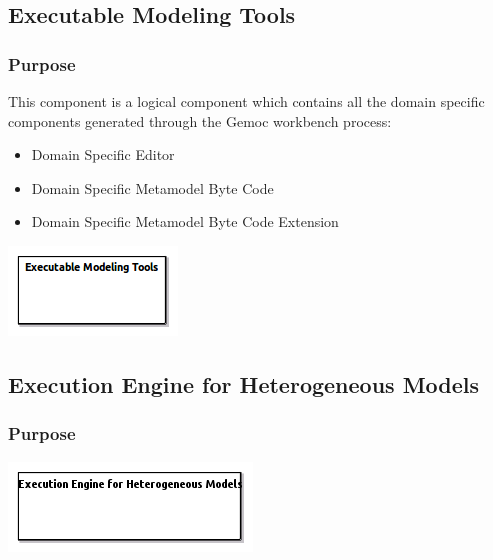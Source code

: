 \documentclass{gemoc} %
\begin{document}
\subsection{Executable Modeling Tools}


\subsubsection{Purpose}
This component is a logical component which contains all the domain specific components generated through the Gemoc workbench process:  
\begin{itemize}
\item Domain Specific Editor
\item Domain Specific Metamodel Byte Code
\item Domain Specific Metamodel Byte Code Extension
\end{itemize}
\begin{center}
\includegraphics*[trim=0.0cm 0.0cm 0cm 0.0cm, clip=true]{../images/generated/Generated_Executable_Modeling_Tools.png}
\end{center}



\subsection{Execution Engine for Heterogeneous Models}


\subsubsection{Purpose}

\begin{center}
\includegraphics*[trim=0.0cm 0.0cm 0cm 0.0cm, clip=true]{../images/generated/Generated_Execution_Engine_for_Heterogeneous_Models.png}
\end{center}
\end{document}
